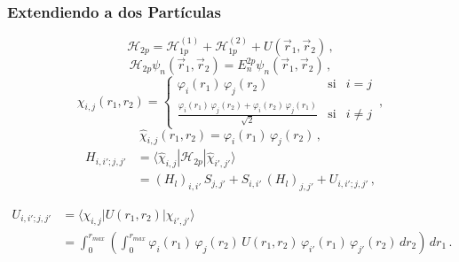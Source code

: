 \documentclass{beamer}
\begin{document}
\begin{frame}
  \frametitle{Extendiendo a dos Part\'iculas}

  \begin{displaymath}\label{hamiltoniano2p}
    \mathcal{H}_{2p} = \mathcal{H}_{1p}^{(1)} + \mathcal{H}_{1p}^{(2)} + U(\vec{r}_1,\vec{r}_2)\,,
  \end{displaymath}
  \begin{displaymath}\label{eq:scho-2p}
    \mathcal{H}_{2p} \psi_n(\vec{r}_1,\vec{r}_2) = E_n^{2p} \psi_n(\vec{r}_1,\vec{r}_2)\,,
  \end{displaymath}
  \begin{displaymath}\label{base-2p}
    \chi_{i,j}(r_1,r_2) = \left\lbrace \begin{array}{ccc}
                        \varphi_i(r_1)\,\varphi_j(r_2) & \mbox{si} & i=j \\
                        \frac{\varphi_i(r_1)\,\varphi_j(r_2)+\varphi_i(r_2)\,\varphi_j(r_1)}{\sqrt{2}} & \mbox{si} & i\neq j
                        \end{array} \right.\,,
  \end{displaymath}
  \begin{displaymath}\label{base-2p-2}
    \hat{\chi}_{i,j}(r_1,r_2) = \varphi_i(r_1)\,\varphi_j(r_2)\,,
  \end{displaymath}
  \begin{displaymath}\label{mat-hamiltoniano-2p}
    \begin{split}
    H_{i,i';j,j'} &= \langle \hat{\chi}_{i,j} |\mathcal{H}_{2p}|\hat{\chi}_{i',j'}\rangle \\
                  &= (H_l)_{i,i'}\,S_{j,j'} + S_{i,i'}\,(H_l)_{j,j'} + U_{i,i';j,j'}\,,
    \end{split}
  \end{displaymath}

  \begin{displaymath}\label{matriz_interaccion}
    \begin{split}
      U_{i,i';j,j'} &= \langle \chi_{i,j} |U(r_1,r_2)|\chi_{i',j'}\rangle \\
                    &=  \int_0^{r_{max}} \left(\int_0^{r_{max}} \varphi_i(r_1)\, \varphi_j(r_2)\,
                    U(r_1,r_2)\, \varphi_{i'}(r_1)\, \varphi_{j'}(r_2)\, dr_2\right)\, dr_1\,.
    \end{split}
  \end{displaymath}
\end{frame}
\end{document}
